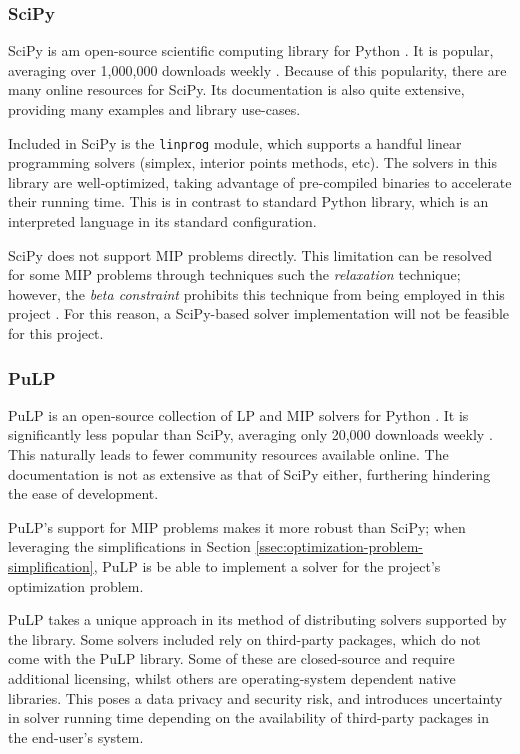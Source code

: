 \documentclass[../mthe-493-final-project.tex]{subfiles}
\begin{document}
    \subsubsection{SciPy}
    \label{sssec:optimization-candidate-scipy}
    
    SciPy is am open-source scientific computing library for Python \cite{2020SciPy-NMeth}. It is popular, averaging over 1,000,000 downloads weekly \cite{flynn_2018_scipy}. Because of this popularity, there are many online resources for SciPy. Its documentation is also quite extensive, providing many examples and library use-cases.
    
    Included in SciPy is the \texttt{linprog} module, which supports a handful linear programming solvers (simplex, interior points methods, etc). The solvers in this library are well-optimized, taking advantage of pre-compiled binaries to accelerate their running time. This is in contrast to standard Python library, which is an interpreted language in its standard configuration.
    
    SciPy does not support MIP problems directly. This limitation can be resolved for some MIP problems through techniques such the \textit{relaxation} technique; however, the \textit{beta constraint} prohibits this technique from being employed in this project \cite{aps2020mosek}. For this reason, a SciPy-based solver implementation will not be feasible for this project.
    
    \subsubsection{PuLP}
    \label{sssec:optimization-candidate-pulp}
    
    PuLP is an open-source collection of LP and MIP solvers for Python \cite{Mitchell11pulp}. It is significantly less popular than SciPy, averaging only 20,000 downloads weekly \cite{flynn_2018_pulp}. This naturally leads to fewer community resources available online. The documentation is not as extensive as that of SciPy either, furthering hindering the ease of development.
    
    PuLP's support for MIP problems makes it more robust than SciPy; when leveraging the simplifications in Section \ref{ssec:optimization-problem-simplification}, PuLP is be able to implement a solver for the project's optimization problem.
    
    PuLP takes a unique approach in its method of distributing solvers supported by the library. Some solvers included rely on third-party packages, which do not come with the PuLP library. Some of these are closed-source and require additional licensing, whilst others are operating-system dependent native libraries. This poses a data privacy and security risk, and introduces uncertainty in solver running time depending on the availability of third-party packages in the end-user's system.
    
\end{document}
